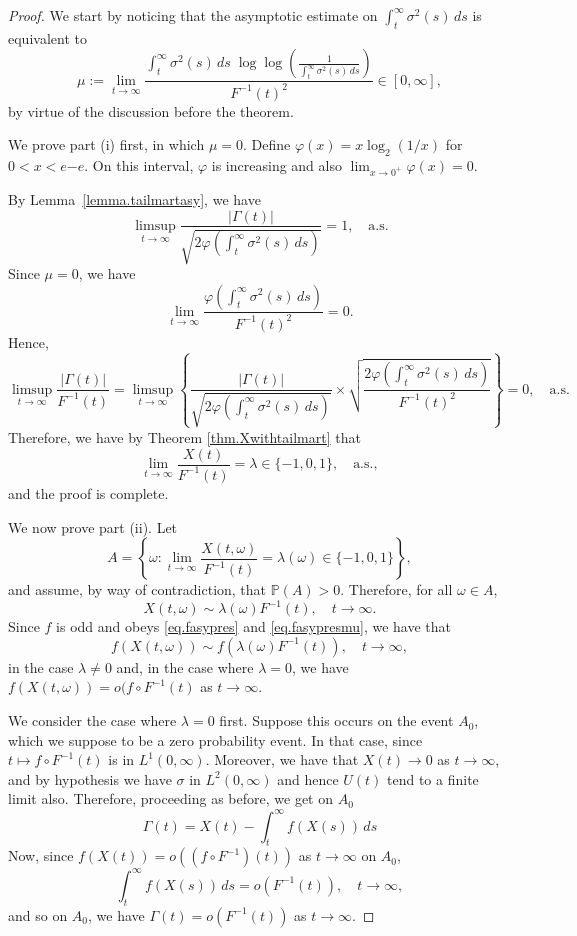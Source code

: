 \documentclass[a4paper,10pt,reqno]{amsart}
\numberwithin{equation}{section}
\theoremstyle{definition}
\theoremstyle{remark}
\DeclareMathOperator{\1}{\mathbbm 1}
\begin{document}
	\begin{proof}
		We start by noticing that the asymptotic estimate on $\int_t^\infty \sigma^2(s)\,ds$ is equivalent to 
		\[
		\mu := \lim_{t \to \infty} \frac{\int_t^\infty \sigma^2(s)\, ds \; \log\log \left( \frac{1}{\int_t^\infty \sigma^2(s) \, ds} \right)}{F^{-1}(t)^2} \in [0,\infty], 
		\]
		by virtue of the discussion before the theorem. 
		
		We prove part (i) first, in which $\mu=0$. Define $\varphi(x)=x\log_2(1/x)$ for $0<x<e{-e}$. On this interval, $\varphi$ is increasing and also $\lim_{x\to 0^+} \varphi(x)=0$.
		
		By Lemma~\ref{lemma.tailmartasy}, we have 
		\[
		\limsup_{t \to \infty} \frac{|\Gamma(t)|}{\sqrt{2\varphi\!\left(\int_t^\infty \sigma^2(s)\, ds\right)}} = 1,\quad \text{a.s.}
		\]
		Since $\mu = 0$, we have
		\[
		\lim_{t \to \infty} \frac{\varphi\!\left(\int_t^\infty \sigma^2(s)\, ds\right)}{F^{-1}(t)^2} = 0.
		\]
		Hence,
		\[
		\limsup_{t \to \infty} \frac{|\Gamma(t)|}{F^{-1}(t)}
		= \limsup_{t \to \infty} 
		\left\{ \frac{|\Gamma(t)|}{\sqrt{2\varphi\!\left(\int_t^\infty \sigma^2(s)\, ds\right)}}
		\times
		\sqrt{\frac{2\varphi\!\left(\int_t^\infty \sigma^2(s)\, ds\right)}{F^{-1}(t)^2}}
		\right\}
		= 0, \quad \text{a.s.}
		\]
		Therefore, we have by Theorem \ref{thm.Xwithtailmart} that
		\[
		\lim_{t \to \infty} \frac{X(t)}{F^{-1}(t)} = \lambda \in \{-1,0,1\}, 
		\quad \text{a.s.},
		\]
		and the proof is complete.
		
		We now prove part (ii). Let
		\[
		A = \left\{ \omega : \lim_{t \to \infty} \frac{X(t,\omega)}{F^{-1}(t)} = \lambda(\omega) \in \{-1,0,1\} \right\},
		\]
		and assume, by way of contradiction, that $\mathbb{P}(A) > 0$. Therefore, for all $\omega \in A$,
		\[
		X(t,\omega) \sim \lambda(\omega) F^{-1}(t), \quad t \to \infty.
		\]
		Since $f$ is odd and obeys \eqref{eq.fasypres} and \eqref{eq.fasypresmu}, we have that 
		\[
		f(X(t,\omega)) \sim f(\lambda(\omega) F^{-1}(t)), \quad t \to \infty,
		\]
		in the case $\lambda\neq 0$ and, in the case where $\lambda=0$, we have $f(X(t,\omega))=o(f\circ F^{-1}(t)$ as $t\to\infty$.
		
		We consider the case where $\lambda=0$ first. Suppose this occurs on the event $A_0$, which we suppose to  be a zero probability event. In that case, since $t\mapsto f\circ F^{-1}(t)$ is in $L^1(0,\infty)$. Moreover, we have that $X(t)\to 0$ as $t\to\infty$, and by hypothesis we have $\sigma$ in $L^2(0,\infty)$ and hence $U(t)$ tend to a finite limit also. Therefore, proceeding as before, we get on $A_0$ 
		\[
		\Gamma(t) = X(t)-\int_t^\infty f(X(s))\,ds
		\] 
		Now, since $f(X(t))=o((f\circ F^{-1})(t))$ as $t\to\infty$ on $A_0$, 
		\[
		\int_t^\infty f(X(s))\,ds = o(F^{-1}(t)), \quad t\to\infty,
		\]
		and so on $A_0$, we have $\Gamma(t)=o(F^{-1}(t))$ as $t\to\infty$. 
		

\end{proof}
\end{document}
